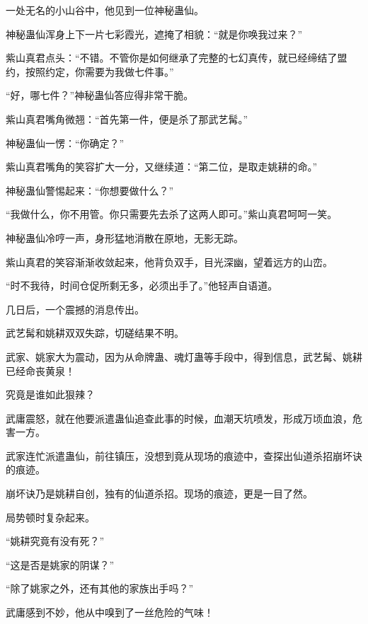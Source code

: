 \begin{this_body}
一处无名的小山谷中，他见到一位神秘蛊仙。

神秘蛊仙浑身上下一片七彩霞光，遮掩了相貌：“就是你唤我过来？”

紫山真君点头：“不错。不管你是如何继承了完整的七幻真传，就已经缔结了盟约，按照约定，你需要为我做七件事。”

“好，哪七件？”神秘蛊仙答应得非常干脆。

紫山真君嘴角微翘：“首先第一件，便是杀了那武艺髯。”

神秘蛊仙一愣：“你确定？”

紫山真君嘴角的笑容扩大一分，又继续道：“第二位，是取走姚耕的命。”

神秘蛊仙警惕起来：“你想要做什么？”

“我做什么，你不用管。你只需要先去杀了这两人即可。”紫山真君呵呵一笑。

神秘蛊仙冷哼一声，身形猛地消散在原地，无影无踪。

紫山真君的笑容渐渐收敛起来，他背负双手，目光深幽，望着远方的山峦。

“时不我待，时间仓促所剩无多，必须出手了。”他轻声自语道。

几日后，一个震撼的消息传出。

武艺髯和姚耕双双失踪，切磋结果不明。

武家、姚家大为震动，因为从命牌蛊、魂灯蛊等手段中，得到信息，武艺髯、姚耕已经命丧黄泉！

究竟是谁如此狠辣？

武庸震怒，就在他要派遣蛊仙追查此事的时候，血潮天坑喷发，形成万顷血浪，危害一方。

武家连忙派遣蛊仙，前往镇压，没想到竟从现场的痕迹中，查探出仙道杀招崩坏诀的痕迹。

崩坏诀乃是姚耕自创，独有的仙道杀招。现场的痕迹，更是一目了然。

局势顿时复杂起来。

“姚耕究竟有没有死？”

“这是否是姚家的阴谋？”

“除了姚家之外，还有其他的家族出手吗？”

武庸感到不妙，他从中嗅到了一丝危险的气味！

\end{this_body}

